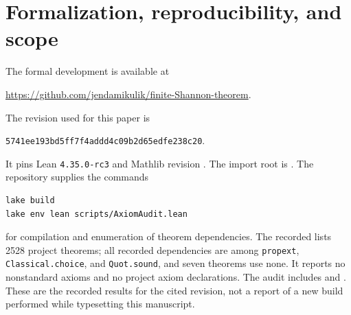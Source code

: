 \documentclass[11pt,a4paper]{article}
\theoremstyle{definition}\newtheorem{definition}[theorem]{Definition}
\theoremstyle{remark}\newtheorem{remark}[theorem]{Remark}
\numberwithin{equation}{section}
\begin{document}
\section{Formalization, reproducibility, and scope}\label{sec:formal}
The formal development is available at
\begin{center}\url{https://github.com/jendamikulik/finite-Shannon-theorem}.\end{center}
The revision used for this paper is
\begin{center}\texttt{5741ee193bd5ff7f4addd4c09b2d65edfe238c20}.\end{center}
It pins Lean \texttt{4.35.0-rc3} and Mathlib revision
.
The import root is . The repository supplies the
commands
\begin{verbatim}
lake build
lake env lean scripts/AxiomAudit.lean
\end{verbatim}
for compilation and enumeration of theorem dependencies.
The recorded  lists 2528 project theorems; all recorded
dependencies are among \texttt{propext}, \texttt{Classical.choice}, and
\texttt{Quot.sound}, and seven theorems use none. It reports no nonstandard
axioms and no project axiom declarations. The audit includes
 and .
These are the recorded results for the cited revision, not a report of a
new build performed while typesetting this manuscript.
\end{document}

